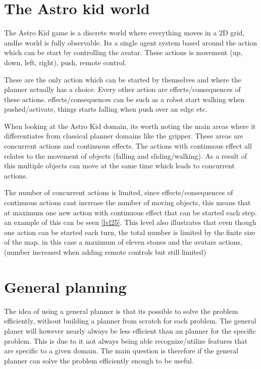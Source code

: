 	\section{The Astro kid world}
	The Astro Kid game is a discrete world where everything moves in a 2D grid, andhe world is fully observable. Its a single agent system based around the action which can be start by controlling the avatar. These actions is movement (up, down, left, right), push, remote control.
	
	These are the only action which can be started by themselves and where the planner actually has a choice. Every other action are effects/consequences of these actions. effects/consequences can be such as a robot start walking when pushed/activate, things starts falling when push over an edge etc.
	
	When looking at the Astro Kid domain, its worth noting the main areas where it differentiates from classical planner domains like the gripper. These areas are concurrent actions and continuous effects. The actions with continuous effect all relates to the movement of objects (falling and sliding/walking). As a result of this multiple objects can move at the same time which leads to concurrent actions.
	
	The number of concurrent actions is limited, since effects/consequences of continuous actions cant increase the number of moving objects, this means that at maximum one new action with continuous effect that can be started each step. an example of this can be seen \ref{lvl25}. This level also illustrates that even though one action can be started each turn, the total number is limited by the finite size of the map. in this case a maximum of eleven stones and the avatars actions, (number increased when adding remote controls but still limited)

\section{General planning}
	The idea of using a general planner is that its possible to solve the problem efficiently, without building a planner from scratch for each problem. The general planer will however nearly always be less efficient than an planner for the specific problem. This is due to it not always being able recognize/utilize features that are specific to a given domain. The main question is therefore if the general planner can solve the problem efficiently enough to be useful.

